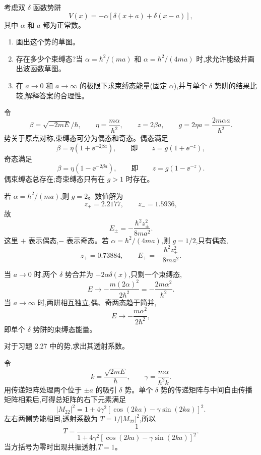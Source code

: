 \begin{question}
考虑双 $\delta$ 函数势阱
\[
V(x)=-\alpha[\delta(x+a)+\delta(x-a)],
\]
其中 $\alpha$ 和 $a$ 都为正常数。
\begin{enumerate}
\item 画出这个势的草图。
\item 存在多少个束缚态?当 $\alpha=\hbar^2/(ma)$ 和 $\alpha=\hbar^2/(4ma)$ 时,求允许能级并画出波函数草图。
\item 在 $a\to0$ 和 $a\to\infty$ 的极限下求束缚态能量(固定 $\alpha$),并与单个 $\delta$ 势阱的结果比较,解释答案的合理性。
\end{enumerate}
\end{question}
\begin{solution}
令
\[
\beta=\sqrt{-2mE}/\hbar,
\qquad
\eta=\frac{m\alpha}{\hbar^2},
\qquad
z=2\beta a,
\qquad
g=2\eta a=\frac{2m\alpha a}{\hbar^2}.
\]
势关于原点对称,束缚态可分为偶态和奇态。偶态满足
\[
\beta=\eta\left(1+\ee^{-2\beta a}\right),
\qquad\text{即}\qquad z=g(1+\ee^{-z}),
\]
奇态满足
\[
\beta=\eta\left(1-\ee^{-2\beta a}\right),
\qquad\text{即}\qquad z=g(1-\ee^{-z}).
\]
偶束缚态总存在;奇束缚态只有在 $g>1$ 时存在。

若 $\alpha=\hbar^2/(ma)$,则 $g=2$。数值解为
\[
z_+=2.2177,
\qquad z_-=1.5936,
\]
故
\[
E_\pm=-\frac{\hbar^2z_\pm^2}{8ma^2}.
\]
这里 $+$ 表示偶态,$-$ 表示奇态。若 $\alpha=\hbar^2/(4ma)$,则 $g=1/2$,只有偶态,
\[
z_+=0.73884,
\qquad
E_+=-\frac{\hbar^2z_+^2}{8ma^2}.
\]

当 $a\to0$ 时,两个 $\delta$ 势合并为 $-2\alpha\delta(x)$,只剩一个束缚态,
\[
E\to-\frac{m(2\alpha)^2}{2\hbar^2}=-\frac{2m\alpha^2}{\hbar^2}.
\]
当 $a\to\infty$ 时,两阱相互独立,偶、奇两态趋于简并,
\[
E\to-\frac{m\alpha^2}{2\hbar^2},
\]
即单个 $\delta$ 势阱的束缚态能量。
\end{solution}

\begin{question}
对于习题 2.27 中的势,求出其透射系数。
\end{question}
\begin{solution}
令
\[
k=\frac{\sqrt{2mE}}{\hbar},
\qquad
\gamma=\frac{m\alpha}{\hbar^2k}.
\]
用传递矩阵处理两个位于 $\pm a$ 的吸引 $\delta$ 势。单个 $\delta$ 势的传递矩阵与中间自由传播矩阵相乘后,可得总矩阵的右下元素满足
\[
|M_{22}|^2=1+4\gamma^2\left[\cos(2ka)-\gamma\sin(2ka)\right]^2.
\]
左右两侧势能相同,透射系数为 $T=1/|M_{22}|^2$,所以
\[
T=\frac{1}{1+4\gamma^2\left[\cos(2ka)-\gamma\sin(2ka)\right]^2}.
\]
当方括号为零时出现共振透射,$T=1$。
\end{solution}

